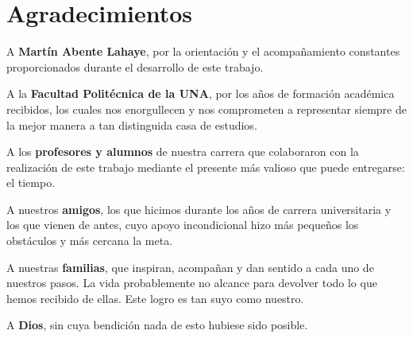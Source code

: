 \chapter*{Agradecimientos}

A \textbf{Martín Abente Lahaye}, por la orientación y el acompañamiento constantes 
proporcionados durante el desarrollo de este trabajo.

A la \textbf{Facultad Politécnica de la UNA}, por los años de formación académica recibidos, los cuales 
nos enorgullecen y nos comprometen a representar siempre de la mejor manera a tan distinguida casa de 
estudios.

A los \textbf{profesores y alumnos} de nuestra carrera que colaboraron con la realización 
de este trabajo mediante el presente más valioso que puede entregarse: el tiempo. 

A nuestros \textbf{amigos}, los que hicimos durante los años de carrera universitaria y los que vienen
de antes, cuyo apoyo incondicional hizo más pequeños los obstáculos y más cercana la meta.

A nuestras \textbf{familias}, que inspiran, acompañan y dan sentido a cada uno de nuestros pasos. La vida probablemente no alcance para devolver todo lo que hemos recibido de ellas. Este logro es tan suyo como nuestro.

A \textbf{Dios}, sin cuya bendición nada de esto hubiese sido posible.
